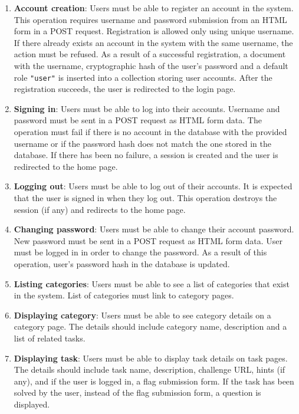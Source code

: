 \begin{enumerate}
	\item \textbf{Account creation}: Users must be able to register an account in the system.
	This operation requires username and password submission from an HTML form in a POST request.
	Registration is allowed only using unique username. If there already exists an account in the system with the same username, the action must be refused.
	As a result of a successful registration, a document with the username, cryptographic hash of the user's password and a default role \texttt{"user"} is inserted into a collection storing user accounts. After the registration succeeds, the user is redirected to the login page.

	\item \textbf{Signing in}: Users must be able to log into their accounts.
	Username and password must be sent in a POST request as HTML form data. The operation must fail if there is no account in the database with the provided username or if the password hash does not match the one stored in the database.
	If there has been no failure, a session is created and the user is redirected to the home page.

	\item \textbf{Logging out}: Users must be able to log out of their accounts.
	It is expected that the user is signed in when they log out. This operation destroys the session (if any) and redirects to the home page.

	\item \textbf{Changing password}: Users must be able to change their account password.
	New password must be sent in a POST request as HTML form data. User must be logged in in order to change the password.
	As a result of this operation, user's password hash in the database is updated.

	\item \textbf{Listing categories}: Users must be able to see a list of categories that exist in the system. List of categories must link to category pages.

	\item \textbf{Displaying category}: Users must be able to see category details on a category page. The details should include category name, description and a list of related tasks.

	\item \textbf{Displaying task}: Users must be able to display task details on task pages. The details should include task name, description, challenge URL, hints (if any), and if the user is logged in, a flag submission form. If the task has been solved by the user, instead of the flag submission form, a question is displayed.


\end{enumerate}

